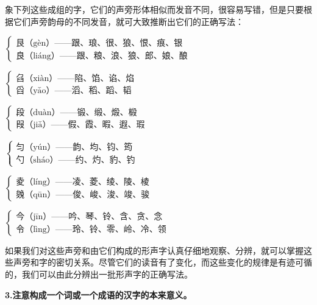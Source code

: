 象下列这些成组的字，它们的声旁形体相似而发音不同，很容易写错，但是只要根据它们声旁韵母的不同发音，就可大致推断出它们的正确写法：

\begin{flushleft}
$
\begin{cases}
	\text{艮（gèn）——跟、琅、很、狼、恨、痕、银}\\
	\text{良（liáng）——跟、粮、浪、狼、郎、娘、酿}
\end{cases}
$

\vspace{1em}

$
\begin{cases}
	\text{臽（xiàn）——陷、馅、谄、焰}\\
	\text{舀（yǎo）——滔、稻、蹈、韬}
\end{cases}
$

\vspace{1em}

$
\begin{cases}
	\text{段（duàn）——锻、缎、煅、椴}\\
	\text{叚（jiǎ）——假、霞、暇、遐、瑕}
\end{cases}
$

\vspace{1em}

$
\begin{cases}
	\text{匀（yún）——韵、均、钧、筠}\\
	\text{勺（sháo）——约、灼、豹、钓}
\end{cases}
$

\vspace{1em}

$
\begin{cases}
	\text{夌（líng）——凌、菱、绫、陵、棱}\\
	\text{㕙（qūn）——俊、峻、浚、竣、骏}
\end{cases}
$

\vspace{1em}
$
\begin{cases}
	\text{今（jīn）——吟、琴、铃、含、贪、念}\\
	\text{令（lìng）——玲、铃、零、岭、冷、领}
\end{cases}
$
\end{flushleft}

如果我们对这些声旁和由它们构成的形声字认真仔细地观察、分辨，就可以掌握这些声旁和字的密切关系。尽管它们的读音有了变化，而这些变化的规律是有迹可循的，我们可以由此分辨出一批形声字的正确写法。

\textbf{3.注意构成一个词或一个成语的汉字的本来意义。}

